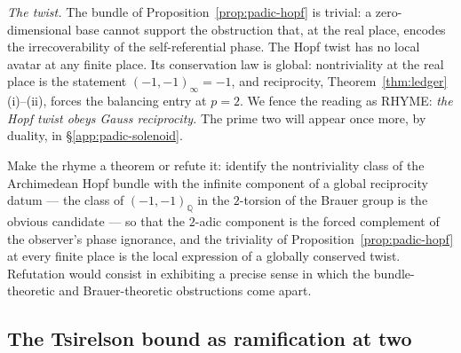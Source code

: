 \emph{The twist.} The bundle of Proposition~\ref{prop:padic-hopf} is trivial: a
zero-dimensional base cannot support the obstruction that, at the real place, encodes
the irrecoverability of the self-referential phase. The Hopf twist has no local avatar
at any finite place. Its conservation law is global: nontriviality at the real place
is the statement $(-1,-1)_{\infty} = -1$, and reciprocity,
Theorem~\ref{thm:ledger}(i)--(ii), forces the balancing entry at $p = 2$. We fence the
reading as RHYME: \emph{the Hopf twist obeys Gauss reciprocity.} The prime two will
appear once more, by duality, in \S\ref{app:padic-solenoid}.

\begin{openproblem}\label{op:padic-reciprocity}
Make the rhyme a theorem or refute it: identify the nontriviality class of the
Archimedean Hopf bundle with the infinite component of a global reciprocity datum ---
the class of $(-1,-1)_{\mathbb{Q}}$ in the $2$-torsion of the Brauer group is the
obvious candidate --- so that the $2$-adic component is the forced complement of the
observer's phase ignorance, and the triviality of Proposition~\ref{prop:padic-hopf} at
every finite place is the local expression of a globally conserved twist. Refutation
would consist in exhibiting a precise sense in which the bundle-theoretic and
Brauer-theoretic obstructions come apart.
\end{openproblem}

\subsection{The Tsirelson bound as ramification at two}
\label{app:padic-tsirelson}

